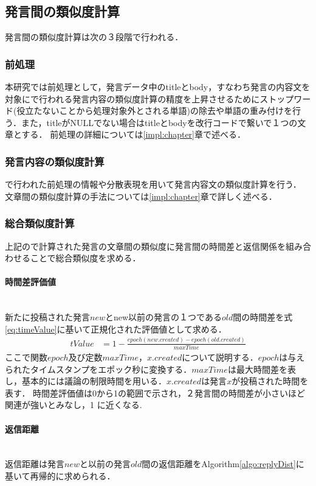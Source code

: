 \subsection{発言間の類似度計算}
\label{model:simRemarkl}
発言間の類似度計算は次の３段階で行われる．
\subsubsection*{ 前処理}
本研究では前処理として，発言データ中のtitleとbody，すなわち発言の内容文を対象にで行われる発言内容の類似度計算の精度を上昇させるためにストップワード(役立たないことから処理対象外とされる単語)の除去や単語の重み付けを行う．また，titleがNULLでない場合はtitleとbodyを改行コードで繋いで１つの文章とする．
前処理の詳細については\ref{impl:chapter}章で述べる．
\subsubsection*{ 発言内容の類似度計算}
\label{model:simRemark:2}
で行われた前処理の情報や分散表現を用いて発言内容文の類似度計算を行う．
文章間の類似度計算の手法については\ref{impl:chapter}章で詳しく述べる．
\subsubsection*{ 総合類似度計算}
上記ので計算された発言の文章間の類似度に発言間の時間差と返信関係を組み合わせることで総合類似度を求める．
\paragraph{時間差評価値}\ \\
新たに投稿された発言$new$とnew以前の発言の１つである$old$間の時間差を式\ref{eq:timeValue}に基いて正規化された評価値として求める．
\begin{equation}
\begin{aligned}
\label{eq:timeValue}
tValue & = 1 - \frac{ epoch(new.created) - epoch(old.created) }{ maxTime }
\end{aligned}
\end{equation}
ここで関数$epoch$及び定数$maxTime$，$x.created$について説明する．$epoch$は与えられたタイムスタンプをエポック秒に変換する．$maxTime$は最大時間差を表し，基本的には議論の制限時間を用いる．$x.created$は発言$x$が投稿された時間を表す．
時間差評価値は0から1の範囲で示され，２発言間の時間差が小さいほど関連が強いとみなし，1 に近くなる.

\paragraph{返信距離}\ \\
返信距離は発言$new$と以前の発言$old$間の返信距離をAlgorithm\ref{algo:replyDist}に基いて再帰的に求められる．

